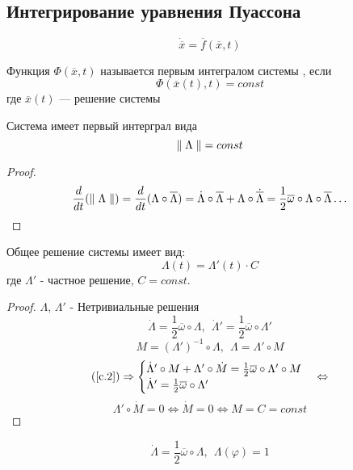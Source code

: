   \subsection{Интегрирование уравнения Пуассона}
  \begin{equation} 
  \label{upper_system}
  \dot{\overline x} = \overline f(\overline x, t)
  \end{equation}
  \begin{df}
  Функция $\Phi(\overline x, t)$ называется первым интегралом системы , если
  \[ \Phi(\overline x(t), t) = const \]
  где $\overline x(t)$ --- решение системы 
  \end{df}
  \begin{ass}
  Система  имеет первый интерграл вида
  \[{\parallel \Lambda \parallel} = const \]
  \end{ass}
  \begin{proof}
  \[ \frac{d}{dt}({\parallel \Lambda \parallel}) = \frac{d}{dt}(\Lambda \circ \overline \Lambda) = \dot \Lambda \circ \overline \Lambda + \Lambda \circ \dot{\overline \Lambda} = \frac{1}{2} \overline \omega \circ \Lambda \circ \overline \Lambda \ldots \]
  \end{proof}
  \begin{ass}
  Общее решение системы  имеет вид:
  \[ \Lambda(t) = \Lambda'(t) \cdot C\]
  где $\Lambda'$ - частное решение, $C = const$.
  \end{ass}
  \begin{proof}
  $\Lambda$, $\Lambda'$ - Нетривиальные решения 
  \[ \dot \Lambda = \frac{1}{2}\overline \omega \circ \Lambda,~~ \dot{\Lambda}' = \frac{1}{2}\overline \omega \circ \Lambda'\]
  \[ M = (\Lambda')^{-1} \circ \Lambda,~~ \Lambda = \Lambda' \circ M \]
  \[ \re{c.2} \Rightarrow \begin{cases}
  \dot \Lambda' \circ M + \Lambda' \circ \dot M = \frac{1}{2} \overline \omega \circ \Lambda' \circ M \\
  \dot \Lambda' = \frac{1}{2}\overline \omega \circ \Lambda'
  \end{cases}  \Leftrightarrow \]
  \[ \Lambda' \circ \dot M = 0 \Leftrightarrow \dot M = 0 \Leftrightarrow M = C = const \]
  \end{proof}
  \begin{cor}
  \begin{equation}
  \label{c.3} 
  \dot \Lambda = \frac{1}{2} \overline \omega \circ \Lambda,~~ \Lambda(\varphi) = 1 
  \end{equation}
  \end{cor}

